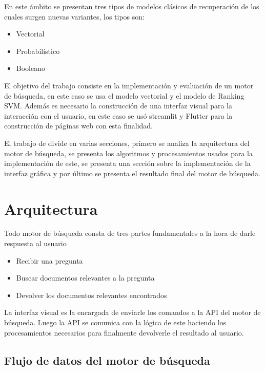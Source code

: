 \documentclass[runningheads]{llncs}
\begin{document}
En este ámbito se presentan tres tipos de modelos clásicos de recuperación de los
cuales surgen nuevas variantes, los tipos son:

\begin{itemize}
    \item Vectorial
    \item Probabilístico
    \item Booleano
\end{itemize}

El objetivo del trabajo consiste en la implementación y evaluación de un motor de búsqueda,
en este caso se usa el modelo vectorial y el modelo de Ranking SVM. Además es necesario la
construcción de una interfaz visual para la interacción con el usuario, en este caso se usó
streamlit y Flutter para la construcción de páginas web con esta finalidad.

El trabajo de divide en varias secciones, primero se analiza la arquitectura del motor de
búsqueda, se presenta los algoritmos y procesamientos usados para la implementación de 
este, se presenta una sección sobre la implementación de la interfaz gráfica y por último
se presenta el resultado final del motor de búsqueda.

\section{Arquitectura}

Todo motor de búsqueda consta de tres partes fundamentales a la hora de darle respuesta al usuario

\begin{itemize}
    \item Recibir una pregunta
    \item Buscar documentos relevantes a la pregunta
    \item Devolver los documentos relevantes encontrados
\end{itemize}

La interfaz visual es la encargada de enviarle los comandos a la API del motor de búsqueda. Luego
la API se comunica con la lógica de este haciendo los procesamientos necesarios para finalmente
devolverle el resultado al usuario.

\subsection{Flujo de datos del motor de búsqueda}
\end{document}
